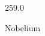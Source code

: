 \documentclass[12pt]{article}
\begin{document}
\hfill{}
\vfill
\begin{center}
  {\fontsize{50}{60}
  }

  259.0

Nobelium
\end{center}
\vfill
\end{document}
